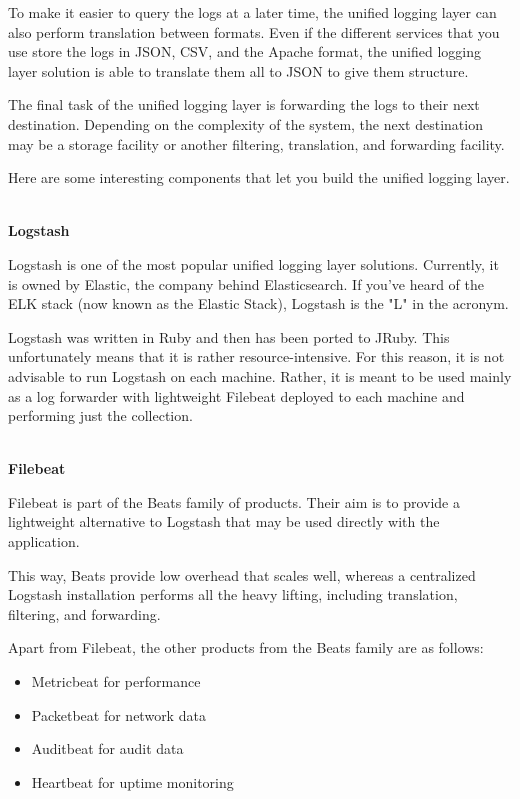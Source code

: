 To make it easier to query the logs at a later time, the unified logging layer can also perform translation between formats. Even if the different services that you use store the logs in JSON, CSV, and the Apache format, the unified logging layer solution is able to translate them all to JSON to give them structure.

The final task of the unified logging layer is forwarding the logs to their next destination. Depending on the complexity of the system, the next destination may be a storage facility or another filtering, translation, and forwarding facility.

Here are some interesting components that let you build the unified logging layer.

\hspace*{\fill} \\ %
\noindent
\textbf{Logstash}

Logstash is one of the most popular unified logging layer solutions. Currently, it is owned by Elastic, the company behind Elasticsearch. If you've heard of the ELK stack (now known as the Elastic Stack), Logstash is the "L" in the acronym.

Logstash was written in Ruby and then has been ported to JRuby. This unfortunately means that it is rather resource-intensive. For this reason, it is not advisable to run Logstash on each machine. Rather, it is meant to be used mainly as a log forwarder with lightweight Filebeat deployed to each machine and performing just the collection.

\hspace*{\fill} \\ %
\noindent
\textbf{Filebeat}

Filebeat is part of the Beats family of products. Their aim is to provide a lightweight alternative to Logstash that may be used directly with the application.

This way, Beats provide low overhead that scales well, whereas a centralized Logstash installation performs all the heavy lifting, including translation, filtering, and forwarding.

Apart from Filebeat, the other products from the Beats family are as follows:

\begin{itemize}
\item 
Metricbeat for performance

\item 
Packetbeat for network data

\item 
Auditbeat for audit data

\item 
Heartbeat for uptime monitoring
\end{itemize}

